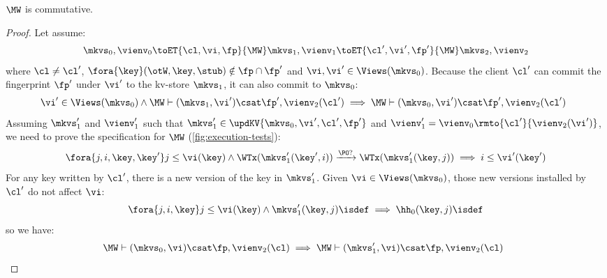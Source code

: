 \begin{lemma}
    \label{lem:mw-comm}
    \(\MW\) is commutative.
\end{lemma}
\begin{proof}
    Let assume:
    \[
        \mkvs_0, \vienv_0 \toET{\cl, \vi, \fp}{\MW} \mkvs_1, \vienv_1 \toET{\cl', \vi', \fp'}{\MW} \mkvs_2, \vienv_2 
    \]
    where \( \cl \neq \cl' \), \( \fora{ \key } (\otW, \key, \stub) \notin \fp \cap \fp' \) and \( \vi, \vi' \in \Views(\mkvs_0)\).
    Because the client \( \cl' \) can commit the fingerprint \( \fp' \) under \( \vi' \) to the kv-store \( \mkvs_1 \), it can also commit to \( \mkvs_0 \):
    \[
        \begin{array}{@{}l}
            \vi' \in \Views(\mkvs_0) \land \MW \vdash (\mkvs_1, \vi') \csat \fp', \vienv_2(\cl') \implies  \MW \vdash (\mkvs_0, \vi') \csat \fp', \vienv_2(\cl')
        \end{array}
    \]
    Assuming \( \mkvs'_1 \) and \( \vienv'_1 \) such that \( \mkvs'_1 \in \updKV{\mkvs_0,\vi',\cl',\fp'} \) and \( \vienv'_1 = \vienv_0\rmto{\cl'}{\vienv_2(\vi')} \), we need to prove the specification for \( \MW \) (\cref{fig:execution-tests}):
    \[
        \fora{j,i, \key, \key'} j \leq \vi(\key) \wedge \WTx(\mkvs'_1(\key', i)) \xrightarrow{\PO ?} \WTx(\mkvs'_1(\key, j)) \implies i \leq \vi'(\key')  \\
    \]
    For any key written by \( \cl' \), there is a new version of the key in \( \mkvs'_1 \).
    Given \( \vi \in \Views(\mkvs_0)\), those new versions installed by \( \cl' \) do not affect \( \vi \):
    \[
        \fora{j,i, \key} j \leq \vi(\key) \land \mkvs'_1(\key, j)\isdef \implies \hh_0(\key, j)\isdef
    \]
    so we have:
    \[
        \begin{array}{@{}l}
            \MW \vdash (\mkvs_0, \vi) \csat \fp, \vienv_2(\cl) \implies  \MW \vdash (\mkvs'_1, \vi) \csat \fp, \vienv_2(\cl)
        \end{array}
    \]
\end{proof}



